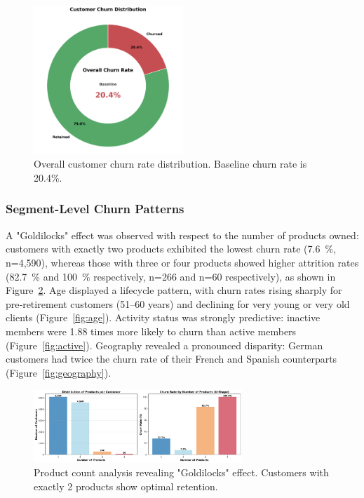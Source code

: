 \documentclass[12pt]{article}
\begin{document}
\begin{figure}[H]
\centering
\includegraphics[width=0.5\textwidth]{img/04_products_donut_chart.png}
\caption{Overall customer churn rate distribution. Baseline churn rate is 20.4\%.}
\label{fig:churn_rate}
\end{figure}

\subsubsection{Segment-Level Churn Patterns}
A "Goldilocks" effect was observed with respect to the number of products owned: customers with exactly two products exhibited the lowest churn rate (7.6~\%, n=4,590), whereas those with three or four products showed higher attrition rates (82.7~\% and 100~\% respectively, n=266 and n=60 respectively), as shown in Figure~\ref{fig:products}. Age displayed a lifecycle pattern, with churn rates rising sharply for pre‑retirement customers (51–60 years) and declining for very young or very old clients (Figure~\ref{fig:age}). Activity status was strongly predictive: inactive members were 1.88 times more likely to churn than active members (Figure~\ref{fig:active}). Geography revealed a pronounced disparity: German customers had twice the churn rate of their French and Spanish counterparts (Figure~\ref{fig:geography}).

\begin{figure}[H]
\centering
\includegraphics[width=0.7\textwidth]{img/04_products_churn_analysis.png}
\caption{Product count analysis revealing "Goldilocks" effect. Customers with exactly 2 products show optimal retention.}
\label{fig:products}
\end{figure}
\end{document}

